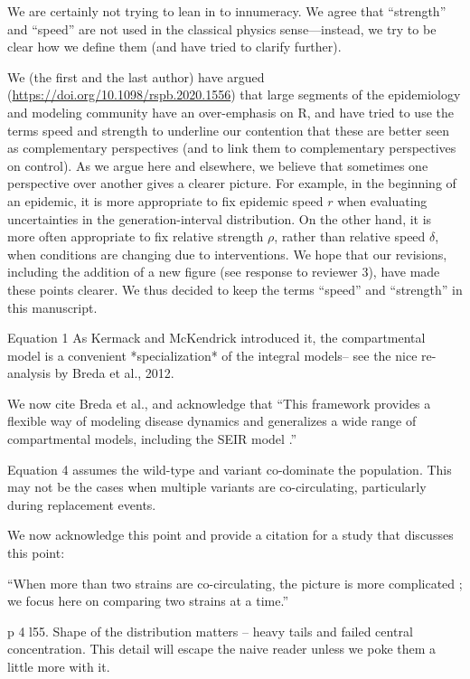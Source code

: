 \documentclass[12pt]{article}
\newcommand{\revtext}{\textsf}
\begin{document}
We are certainly not trying to lean in to innumeracy. We agree that ``strength'' and ``speed'' are not used in the classical physics sense---instead, we try to be clear how we define them (and have tried to clarify further).

We (the first and the last author) have argued (\url{https://doi.org/10.1098/rspb.2020.1556}) that large segments of the epidemiology and modeling community have an over-emphasis on R, and have tried to use the terms speed and strength to underline our contention that these are better seen as complementary perspectives (and to link them to complementary perspectives on control).
As we argue here and elsewhere, we believe that sometimes one perspective over another gives a clearer picture.
For example, in the beginning of an epidemic, it is more appropriate to fix epidemic speed $r$ when evaluating uncertainties in the generation-interval distribution.
On the other hand, it is more often appropriate to fix relative strength $\rho$, rather than relative speed $\delta$, when conditions are changing due to interventions.
We hope that our revisions, including the addition of a new figure (see response to reviewer 3), have made these points clearer.
We thus decided to keep the terms ``speed'' and ``strength'' in this manuscript.

\revtext{Equation 1 As Kermack and McKendrick introduced it, the compartmental model is a convenient *specialization* of the integral models-- see the nice re-analysis by Breda et al., 2012.}

We now cite Breda et al., and acknowledge that ``This framework provides a flexible way of modeling disease dynamics and generalizes a wide range of compartmental models, including the SEIR model \citep{heesterbeek1996concept, diekmann2000mathematical, roberts2004modelling, aldis2005integral,breda2012formulation, champredon2018equivalence}.''

\revtext{Equation 4 assumes the wild-type and variant co-dominate the population.  This may not be the cases when multiple variants are co-circulating, particularly during replacement events.}

We now acknowledge this point and provide a citation for a study that discusses this point:

``When more than two strains are co-circulating, the picture is more complicated \citep{campbell2021increased}; we focus here on comparing two strains at a time.''

\revtext{p 4 l55.  Shape of the distribution matters -- heavy tails and failed central concentration.  This detail will escape the naive reader unless we poke them a little more with it.}
\end{document}
